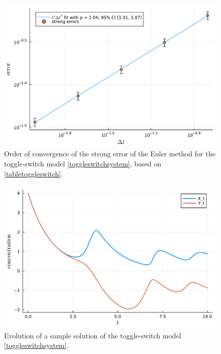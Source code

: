 \documentclass[reqno,12pt]{amsart}
\theoremstyle{plain} %
\theoremstyle{definition} %
\begin{document}
\begin{figure}[htb]
    \includegraphics[scale=0.6]{img/order_toggleswitch.pdf}
    \caption{Order of convergence of the strong error of the Euler method for the toggle-switch model \eqref{toggleswitchsystem}, based on \cref{tabletoggleswitch}.}
    \label{figtoggleswitch}
\end{figure}

\begin{figure}[htb]
    \includegraphics[scale=0.6]{img/evolution_toggleswitch.pdf}
    \caption{Evolution of a sample solution of the toggle-switch model \eqref{toggleswitchsystem}.}
    \label{figtoggleswitchevolution}
\end{figure}
\end{document}
